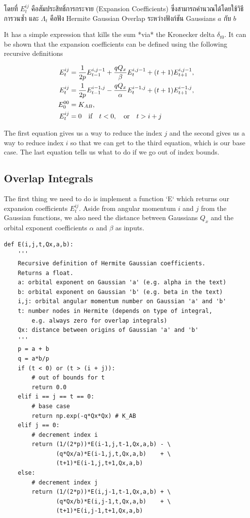 \noindent โดยที่ $E_{t}^{ij}$ คือสัมประสิทธิ์การกระจาย (Expansion Coefficients) ซึ่งสามารถคำนวณได้โดยใช้วิธีการวนซ้ำ
และ $\Lambda_t$ คือฟัง Hermite Gaussian Overlap ระหว่างฟังก์ชัน Gaussians $a$ กับ $b$ 

It has a simple expression that kills the sum *via* the Kronecker
delta $\delta_{t0}$. It can be shown that the expansion coefficients can
be defined using the following recursive definitions 

\begin{align}
  E^{ij}_t 
  &= \frac{1}{2p}E^{i,j-1}_{t-1} + \frac{qQ_x}{\beta} E_{t}^{i,j-1} + (t+1) E_{t+1}^{i,j-1}, \\
  E^{ij}_t &= \frac{1}{2p}E^{i-1,j}_{t-1} - \frac{qQ_x}{\alpha} E_{t}^{i-1,j} + (t+1) E_{t+1}^{i-1,j}, \\
  E^{00}_{0} &= K_{AB}, \\
  E^{ij}_t &= 0 \quad \hbox{if} \quad t < 0, \quad \hbox{or} \quad t > i+j
\end{align}

The first equation gives us a way to reduce the index $j$ and the second
gives us a way to reduce index $i$ so that we can get to the third
equation, which is our base case. The last equation tells us what to do
if we go out of index bounds.

\subsection{Overlap Integrals}

The first thing we need to do is implement a function `E` which returns
our expansion coefficients $E_t^{ij}$. Aside from angular momentum $i$
and $j$ from the Gaussian functions, we also need the distance between
Gaussians $Q_x$ and the orbital exponent coefficients $\alpha$ and
$\beta$ as inputs.

\begin{lstlisting}[style=MyPython]
def E(i,j,t,Qx,a,b):
    '''
    Recursive definition of Hermite Gaussian coefficients.
    Returns a float.
    a: orbital exponent on Gaussian 'a' (e.g. alpha in the text)
    b: orbital exponent on Gaussian 'b' (e.g. beta in the text)
    i,j: orbital angular momentum number on Gaussian 'a' and 'b'
    t: number nodes in Hermite (depends on type of integral, 
        e.g. always zero for overlap integrals)
    Qx: distance between origins of Gaussian 'a' and 'b'
    '''
    p = a + b
    q = a*b/p
    if (t < 0) or (t > (i + j)):
        # out of bounds for t  
        return 0.0
    elif i == j == t == 0:
        # base case
        return np.exp(-q*Qx*Qx) # K_AB
    elif j == 0:
        # decrement index i
        return (1/(2*p))*E(i-1,j,t-1,Qx,a,b) - \
               (q*Qx/a)*E(i-1,j,t,Qx,a,b)    + \
               (t+1)*E(i-1,j,t+1,Qx,a,b)
    else:
        # decrement index j
        return (1/(2*p))*E(i,j-1,t-1,Qx,a,b) + \
               (q*Qx/b)*E(i,j-1,t,Qx,a,b)    + \
               (t+1)*E(i,j-1,t+1,Qx,a,b)
\end{lstlisting}

